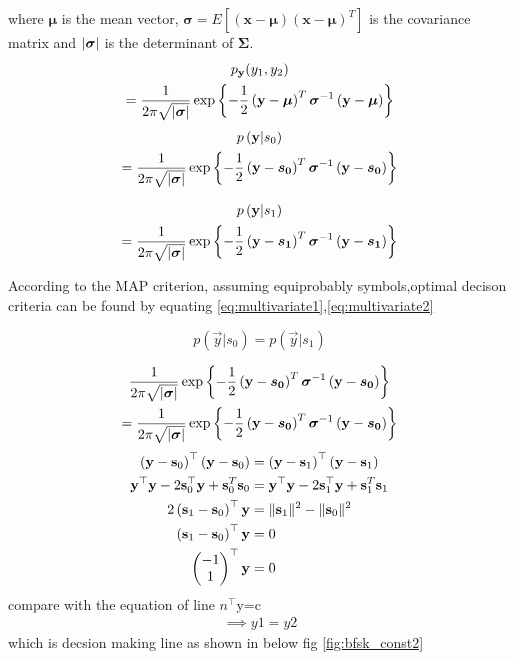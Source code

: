 \documentclass[10pt, a4paper]{article}
\providecommand{\sbrak}[1]{\ensuremath{{}\left[#1\right]}}
\providecommand{\brak}[1]{\ensuremath{\left(#1\right)}}
\begin{document}
\begin{enumerate}
%
where $\bm{\mu}$ is the mean vector, $\bm{\sigma} = E\sbrak{\brak{\mathbf{x}-\bm{\mu}}\brak{\mathbf{x}-\bm{\mu}}^T}$ is the covariance matrix and $\vert\bm{\sigma}\vert$ is the determinant of $\bm{\Sigma}$.
\begin{multline}
\label{eq:multivariate}
p_{\mathbf{y}}(y_1,y_2)
\\
=\frac{1}{2\pi\sqrt{\abs{\bm{\sigma}}}}\exp\cbrak{-\frac{1}{2}\brak{\mathbf{y}-\bm{\mu}}^T\bm{\sigma}^{-1}\brak{\mathbf{y}-\bm{\mu}}}
\end{multline}
\begin{multline}
p\brak{\vec{y}|s_0}
\\
=\frac{1}{2\pi\sqrt{\abs{\bm{\sigma}}}}\exp\cbrak{-\frac{1}{2}\brak{\mathbf{y}-\bm{s_0}}^T\bm{\sigma}^{-1}\brak{\mathbf{y}-\bm{s_0}}}
\label{eq:multivariate1}
\end{multline}

\begin{multline}
p\brak{\vec{y}|s_1}
\\
=\frac{1}{2\pi\sqrt{\abs{\bm{\sigma}}}}\exp\cbrak{-\frac{1}{2}\brak{\mathbf{y}-\bm{s_1}}^T\bm{\sigma}^{-1}\brak{\mathbf{y}-\bm{s_1}}}
\label{eq:multivariate2}
\end{multline}



According to the MAP criterion, assuming equiprobably symbols,optimal decison criteria can be found by equating \eqref{eq:multivariate1},\eqref{eq:multivariate2}

\begin{equation}
p\brak{\vec{y}|s_0}=p\brak{\vec{y}|s_1}
\label{eq:map_bfsk_dec1}
\end{equation}

\begin{multline*}
\frac{1}{2\pi\sqrt{\abs{\bm{\sigma}}}}\exp\cbrak{-\frac{1}{2}\brak{\mathbf{y}-\bm{s_0}}^T\bm{\sigma}^{-1}\brak{\mathbf{y}-\bm{s_0}}} \\ =\frac{1}{2\pi\sqrt{\abs{\bm{\sigma}}}}\exp\cbrak{-\frac{1}{2}\brak{\mathbf{y}-\bm{s_0}}^T\bm{\sigma}^{-1}\brak{\mathbf{y}-\bm{s_0}}}
\end{multline*}
\begin{align*}
\brak{\vec{y}-\vec{s}_0}^\top \brak{\vec{y}-\vec{s}_0} &= \brak{\vec{y}-\vec{s}_1}^\top \brak{\vec{y}-\vec{s}_1}\\
\vec{y}^\top\vec{y} - 2\vec{s}_0^\top \vec{y} + \vec{s}_0^T\vec{s}_0 &= \vec{y}^\top\vec{y} - 2\vec{s}_1^\top \vec{y} + \vec{s}_1^T\vec{s}_1\\
 2\brak{\vec{s}_1-\vec{s}_0}^\top \vec{y} &= \norm{\vec{s}_1}^2 - \norm{\vec{s}_0}^2\\
\brak{\vec{s}_1-\vec{s}_0}^\top \vec{y} &= 0\\
\myvec{-1\\1}^\top \vec{y} &= 0
\end{align*}
compare with the equation of line $ n^\top$y=c\\
\begin{align*}
  \implies y1=y2  
\end{align*}
which is decsion making line as shown in below fig
\ref{fig:bfsk_const2}


\end{enumerate}
\end{document}
